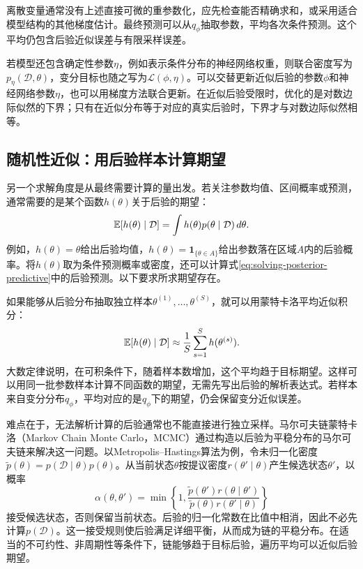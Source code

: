 离散变量通常没有上述直接可微的重参数化，应先检查能否精确求和，或采用适合模型结构的其他梯度估计。最终预测可以从$q_\phi$抽取参数，平均各次条件预测。这个平均仍包含后验近似误差与有限采样误差。

若模型还包含确定性参数$\eta$，例如表示条件分布的神经网络权重，则联合密度写为$p_\eta(\mathcal D,\theta)$，变分目标也随之写为$\mathcal L(\phi,\eta)$。可以交替更新近似后验的参数$\phi$和神经网络参数$\eta$，也可以用梯度方法联合更新。在近似后验受限时，优化的是对数边际似然的下界；只有在近似分布等于对应的真实后验时，下界才与对数边际似然相等。

\subsection{随机性近似：用后验样本计算期望}
另一个求解角度是从最终需要计算的量出发。若关注参数均值、区间概率或预测，通常需要的是某个函数$h(\theta)$关于后验的期望：
\begin{equation}
 \mathbb{E}[h(\theta)\mid\mathcal D]
 =\int h(\theta)p(\theta\mid\mathcal D)\,d\theta.
\end{equation}
例如，$h(\theta)=\theta$给出后验均值，$h(\theta)=\mathbf 1_{\{\theta\in A\}}$给出参数落在区域$A$内的后验概率。将$h(\theta)$取为条件预测概率或密度，还可以计算式\eqref{eq:solving-posterior-predictive}中的后验预测。以下要求所求期望存在。

如果能够从后验分布抽取独立样本$\theta^{(1)},\ldots,\theta^{(S)}$，就可以用蒙特卡洛平均近似积分：
\begin{equation}
 \mathbb{E}[h(\theta)\mid\mathcal D]
 \approx\frac1S\sum_{s=1}^S h(\theta^{(s)}).
\end{equation}
大数定律说明，在可积条件下，随着样本数增加，这个平均趋于目标期望。这样可以用同一批参数样本计算不同函数的期望，无需先写出后验的解析表达式。若样本来自变分分布$q_\phi$，平均对应的是$q_\phi$下的期望，仍会保留变分近似误差。

难点在于，无法解析计算的后验通常也不能直接进行独立采样。马尔可夫链蒙特卡洛（Markov Chain Monte Carlo，MCMC）通过构造以后验为平稳分布的马尔可夫链来解决这一问题。以Metropolis--Hastings算法为例，令未归一化密度$\widetilde p(\theta)=p(\mathcal D\mid\theta)p(\theta)$。从当前状态$\theta$按提议密度$r(\theta'\mid\theta)$产生候选状态$\theta'$，以概率
\begin{equation}
 \alpha(\theta,\theta')=\min\left\{1,
 \frac{\widetilde p(\theta')r(\theta\mid\theta')}
 {\widetilde p(\theta)r(\theta'\mid\theta)}\right\}
\end{equation}
接受候选状态，否则保留当前状态。后验的归一化常数在比值中相消，因此不必先计算$p(\mathcal D)$。这一接受规则使后验满足详细平衡，从而成为链的平稳分布。在适当的不可约性、非周期性等条件下，链能够趋于目标后验，遍历平均可以近似后验期望。

